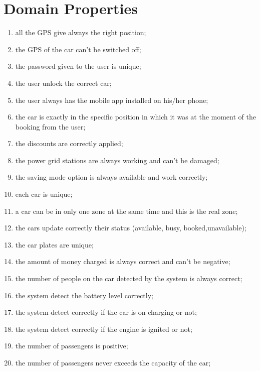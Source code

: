 \section{Domain Properties}
\begin{enumerate}
	\item all the GPS give always the right position;
	\item the GPS of the car can't be switched off;
	\item the password given to the user is unique;
	\item the user unlock the correct car;
	\item the user always has the mobile app installed on his/her phone;
	\item the car is exactly in the specific position in which it was at the moment of the booking from the user;
	\item the discounts are correctly applied;
	\item the power grid stations are always working and can't be damaged;
	\item the saving mode option is always available and work correctly;
	\item each car is unique;
	\item a car can be in only one zone at the same time and this is the real zone;
	\item the cars update correctly their status (available, busy, booked,unavailable);
	\item the car plates are unique;
    \item the amount of money charged is always correct and can't be negative;
    \item the number of people on the car detected by the system is always correct;
    \item the system detect the battery level correctly;
    \item the system detect correctly if the car is on charging or not;
    \item the system detect correctly if the engine is ignited or not;
    \item the number of passengers is positive;
    \item the number of passengers never exceeds the capacity of the car;

    
  
   
    
\end{enumerate}
